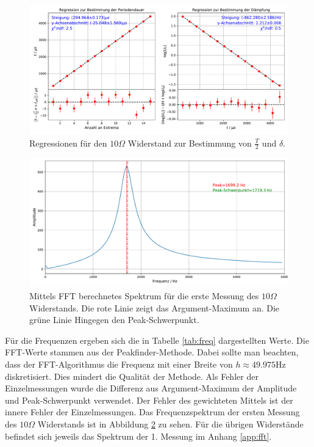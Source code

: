 \documentclass[a4paper, 12pt]{scrartcl}
\begin{document}
\begin{figure}[h]
\centering
\includegraphics[width=\textwidth]{plots/reg_schwingung3.pdf}
\caption{Regressionen für den $10\Omega$ Widerstand zur Bestimmung von $\frac{T}{2}$ und $\delta$.}
\label{abb:reg1}
\end{figure}

\begin{figure}[h]
\centering
\includegraphics[width=\textwidth]{plots/fft/fft_schwingung3_1.pdf}
\caption{Mittels FFT berechnetes Spektrum für die erste Messung des $10\Omega$ Widerstands. Die rote Linie zeigt das Argument-Maximum an. Die grüne Linie Hingegen den Peak-Schwerpunkt.}
\label{abb:fft1}
\end{figure}

Für die Frequenzen ergeben sich die in Tabelle \ref{tab:freq} dargestellten Werte. Die FFT-Werte stammen aus der Peakfinder-Methode. Dabei sollte man beachten, dass der FFT-Algorithmus die Frequenz mit einer Breite von $h\approx 49.975 \text{Hz}$ diskretisiert. Dies mindert die Qualität der Methode. Als Fehler der Einzelmessungen wurde die Differenz aus Argument-Maximum der Amplitude und Peak-Schwerpunkt verwendet. Der Fehler des gewichteten Mittels ist der innere Fehler der Einzelmessungen. Das Frequenzspektrum der ersten Messung des $10\Omega$ Widerstands ist in Abbildung \ref{abb:fft1} zu sehen. Für die übrigen Widerstände befindet sich jeweils das Spektrum der 1. Messung im Anhang \ref{app:fft}.
\end{document}
